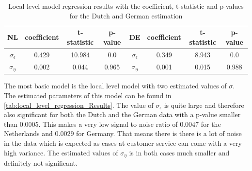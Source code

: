 \label{subsec:forecast_results}
\begin{table}[]
    \centering
    \begin{tabular}{|c|c c c||c|c c c|}\hline
        NL & coefficient & t-statistic & p-value & DE & coefficient & t-statistic & p-value\\\hline        
        $\sigma_{\epsilon}$ & 0.429 & 10.984 & 0.0 & $\sigma_{\epsilon}$ & 0.349 & 8.943 & 0.0\\
        $\sigma_{\eta}$ & 0.002 & 0.044 & 0.965 & $\sigma_{\eta}$ & 0.001 & 0.015 & 0.988\\\hline
    \end{tabular}
    \caption{Local level model regression results with the coefficient, t-statistic and p-values for the Dutch and German estimation}
    \label{tab:local_level_regression_Results}
\end{table}
The most basic model is the local level model with two estimated values of $\sigma$. The estimated parameters of this model can be found in \autoref{tab:local_level_regression_Results}. The value of $\sigma_{\epsilon}$ is quite large and therefore also significant for both the Dutch and the German data with a p-value smaller than 0.0005. This makes a very low signal to noise ratio of 0.0047 for the Netherlands and 0.0029 for Germany. That means there is there is a lot of noise in the data which is expected as cases at customer service can come with a very high variance. The estimated values of $\sigma_{\eta}$  is in both cases much smaller and definitely not significant.\\

